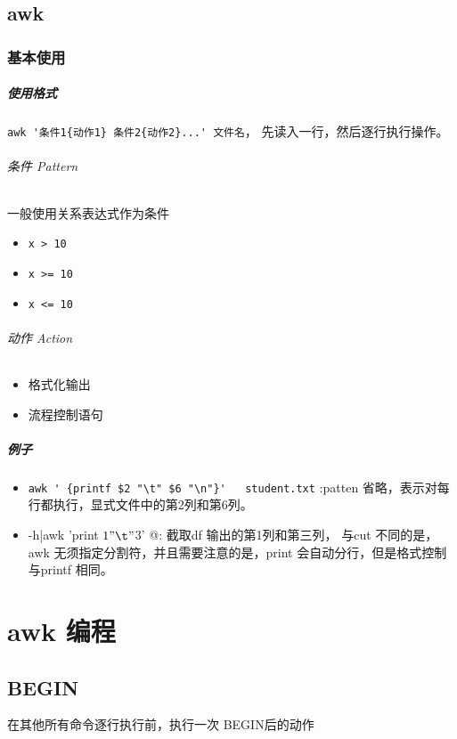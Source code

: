 \documentclass[UTF8,a4paper,12pt]{ctexbook}
\begin{document}
	\section{awk}
		\subsection{基本使用}
			\paragraph{使用格式}
				\verb|awk '条件1{动作1} 条件2{动作2}...' 文件名|， 先读入一行，然后逐行执行操作。
				
				\subparagraph{条件 Pattern}一般使用关系表达式作为条件
					\begin{itemize}[itemindent = 1em]
						\item \verb|x > 10|
						\item \verb|x >= 10|
						\item \verb|x <= 10|
					\end{itemize}
			
				\subparagraph{动作 Action}
					\begin{itemize}[itemindent = 1em]
						\item 格式化输出
						\item 流程控制语句
					\end{itemize}
			
			\paragraph{例子}
				\begin{itemize}
					\item \verb|awk ' {printf $2 "\t" $6 "\n"}'   student.txt|  :patten 省略，表示对每行都执行，显式文件中的第2列和第6列。
					\item \verb@df -h|awk '{print $1 "\t" $3}' @: 截取df 输出的第1列和第三列， 与cut 不同的是，awk 无须指定分割符，并且需要注意的是，print 会自动分行，但是格式控制与printf 相同。
				\end{itemize}
				
		
\chapter{awk 编程}
		\section{BEGIN} 在其他所有命令逐行执行前，执行一次 BEGIN后的动作
		
\end{document}
